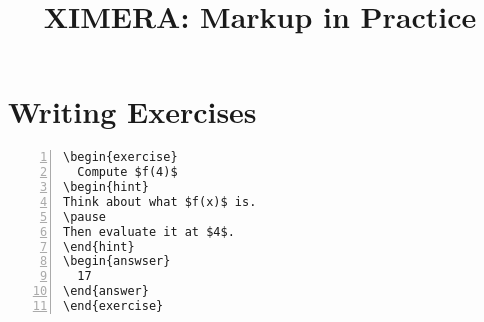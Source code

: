\documentclass[12pt]{amsart}
\begin{document}
\title{XIMERA: Markup in Practice} %
\maketitle

\section{Writing Exercises}




\begin{Verbatim}[frame=single,numbers=left]
\begin{exercise}
  Compute $f(4)$
\begin{hint}
Think about what $f(x)$ is.
\pause
Then evaluate it at $4$.
\end{hint}
\begin{answser}
  17
\end{answer}
\end{exercise}
\end{Verbatim}
\end{document}

